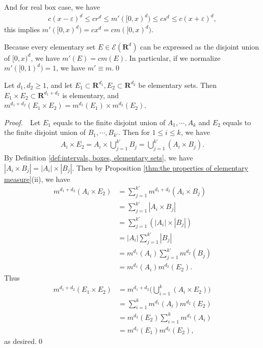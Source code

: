 \documentclass{book}
\theoremstyle{defstyle}
\theoremstyle{thmstyle}
\newcommand{\pff}{\noindent\emph{Proof.}~~}
\newcounter{Proposition}[section]
\begin{document}
And for real box case, we have
    \begin{align*}
        c(x - \varepsilon)^d \leq cr^d \leq m'([0, x)^d) \leq cs^d \leq c(x + \varepsilon)^d,
    \end{align*}
this implies $m'([0, x)^d) = cx^d = cm([0, x)^d)$.

Because every elementary set $E \in \mathcal{E}(\mathbf{R}^d)$ can be expressed as the disjoint union of $[0, x)^d$, we have $m'(E) = cm(E)$. In particular, if we normalize $m'([0, 1)^d) = 1$, we have $m' \equiv m$.\qed

\begin{lemma}\label{thm:m(ExF)=m(E)m(F) for elementary sets}
    Let $d_1, d_2 \geq 1$, and let $E_1 \subset \mathbf{R}^{d_1}, E_2 \subset \mathbf{R}^{d_2}$ be elementary sets. Then $E_1 \times E_2 \subset \mathbf{R}^{d_1 + d_2}$ is elementary, and $m^{d_1 + d_2}(E_1 \times E_2) = m^{d_1}(E_1) \times m^{d_2}(E_2)$.
\end{lemma}

\pff Let $E_1$ equals to the finite disjoint union of $A_1, \cdots, A_k$ and $E_2$ equals to the finite disjoint union of $B_1, \cdots, B_{k'}$. Then for $1 \leq i \leq k$, we have
    \begin{align*}
        A_i \times E_2
        = A_i \times \bigcup_{j = 1}^{k'} B_j
        = \bigcup_{j = 1}^{k'} (A_i \times B_j).
    \end{align*}
By Definition \ref{def:intervals, boxes, elementary sets}, we have $|A_i \times B_j| = |A_i| \times |B_j|$. Then by Proposition \ref{thm:the properties of elementary measure}(ii), we have
    \begin{align*}
        m^{d_1 + d_2}(A_i \times E_2)
        &= \sum_{j = 1}^{k'}m^{d_1 + d_2}(A_i \times B_j)\\
        &= \sum_{j = 1}^{k'}|A_i \times B_j|\\
        &= \sum_{j = 1}^{k'} (|A_i| \times |B_j|)\\
        &= |A_i|\sum_{j = 1}^{k'} |B_j|\\
        &= m^{d_1}(A_i)\sum_{j = 1}^{k'} m^{d_2}(B_j)\\
        &= m^{d_1}(A_i)m^{d_2}(E_2).
    \end{align*}
Thus
    \begin{align*}
        m^{d_1 + d_2}(E_1 \times E_2)
        &= m^{d_1 + d_2}\Big(\bigcup_{i = 1}^{k}(A_i\times E_2)\Big)\\
        &= \sum_{i = 1}^{k}m^{d_1}(A_i)m^{d_2}(E_2)\\
        &= m^{d_2}(E_2) \sum_{i = 1}^{k}m^{d_1}(A_i)\\
        &= m^{d_1}(E_1)m^{d_2}(E_2),
    \end{align*}
as desired.\qed
\end{document}
